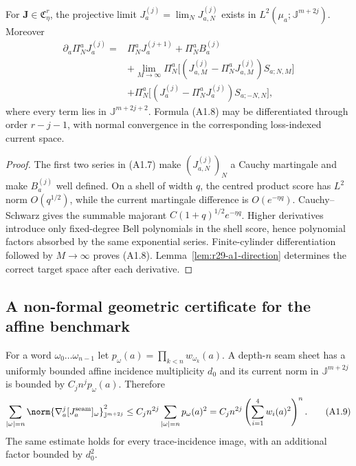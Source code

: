 \begin{theorem}
\label{thm:r29-a1-projective}
For $\mathbf J\in\mathfrak C^r_\eta$, the projective limit
$J^{(j)}_a=\lim_NJ^{(j)}_{a,N}$ exists in
$L^2(\mu_a;\mathbb J^{m+2j})$.  Moreover
\begin{equation}\tag{A1.8}
\begin{split}
 \partial_a\Pi_N^aJ^{(j)}_a
  ={}&\Pi_N^aJ^{(j+1)}_a+\Pi_N^aB^{(j)}_a\\
    &+\lim_{M\to\infty}\Pi_N^a\!\bigl[
      (J^{(j)}_{a,M}-\Pi_N^aJ^{(j)}_{a,M})S_{a;N,M}\bigr]\\
    &+\Pi_N^a\!\bigl[(J^{(j)}_a-\Pi_N^aJ^{(j)}_a)
      S_{a;-N,N}\bigr],
\end{split}
\end{equation}
where every term lies in $\mathbb J^{m+2j+2}$.  Formula (A1.8) may be
differentiated through order $r-j-1$, with normal convergence in the
corresponding loss-indexed current space.
\end{theorem}

\begin{proof}
The first two series in (A1.7) make $(J^{(j)}_{a,N})_N$ a Cauchy martingale and
make $B^{(j)}_a$ well defined.  On a shell of width $q$, the centred product
score has $L^2$ norm $O(q^{1/2})$, while the current martingale difference is
$O(e^{-\eta q})$.  Cauchy--Schwarz gives the summable majorant
$C(1+q)^{1/2}e^{-\eta q}$.  Higher derivatives introduce only fixed-degree
Bell polynomials in the shell score, hence polynomial factors absorbed by the
same exponential series.  Finite-cylinder differentiation followed by
$M\to\infty$ proves (A1.8).  Lemma~\ref{lem:r29-a1-direction} determines the
correct target space after each derivative.
\end{proof}

\subsection{A non-formal geometric certificate for the affine benchmark}

For a word $\omega_0\ldots\omega_{n-1}$ let
$p_\omega(a)=\prod_{k<n}w_{\omega_k}(a)$.  A depth-$n$ seam sheet has a
uniformly bounded affine incidence multiplicity $d_0$ and its current norm in
$\mathbb J^{m+2j}$ is bounded by $C_jn^jp_\omega(a)$.  Therefore
\[
 \sum_{|\omega|=n}
 \norm{\nabla_a^j[J_a^{\rm seam}]_\omega}_{\mathbb J^{m+2j}}^2
 \le C_jn^{2j}\sum_{|\omega|=n}p_\omega(a)^2
 =C_jn^{2j}\left(\sum_{i=1}^{4}w_i(a)^2\right)^n.         \tag{A1.9}
\]
The same estimate holds for every trace-incidence image, with an additional
factor bounded by $d_0^2$.

